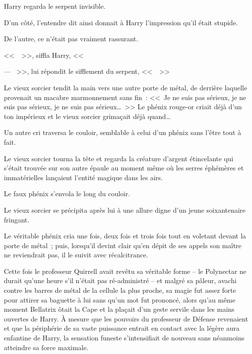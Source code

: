 Harry regarda le serpent invisible.

D'un côté, l'entendre dit ainsi donnait à Harry l'impression qu'il était stupide.

De l'autre, ce n'était pas vraiment rassurant.

<<~~>>, siffla Harry, <<~

--- ~>>, lui répondit le sifflement du serpent, <<~~>>

\later

Le vieux sorcier tendit la main vers une autre porte de métal, de derrière laquelle provenait un macabre marmonnement sans fin~: <<~Je ne suis pas sérieux, je ne suis pas sérieux, je ne suis pas sérieux…~>> Le phénix rouge-or criait déjà d'un ton impérieux et le vieux sorcier grimaçait déjà quand…

Un autre cri traversa le couloir, semblable à celui d'un phénix sans l'être tout à fait.

Le vieux sorcier tourna la tête et regarda la créature d'argent étincelante qui s'était trouvée sur son autre épaule au moment même où les serres éphémères et immatérielles lançaient l'entité magique dans les airs.

Le faux phénix s'envola le long du couloir.

Le vieux sorcier se précipita après lui à une allure digne d'un jeune soixantenaire fringant.

Le véritable phénix cria une fois, deux fois et trois fois tout en voletant devant la porte de métal~; puis, lorsqu'il devint clair qu'en dépit de ses appels son maître ne reviendrait pas, il le suivit avec récalcitrance.

\later

Cette fois le professeur Quirrell avait revêtu sa véritable forme -- le Polynectar ne durait qu'une heure s'il n'était pas ré-administré -- et malgré sa pâleur, avachi contre les barres de métal de la cellule la plus proche, sa magie fut assez forte pour attirer sa baguette à lui sans qu'un mot fut prononcé, alors qu'au même moment Bellatrix ôtait la Cape et la plaçait d'un geste servile dans les mains ouvertes de Harry. À mesure que les pouvoirs du professeur de Défense revenaient et que la périphérie de sa vaste puissance entrait en contact avec la légère aura enfantine de Harry, la sensation funeste s'intensifiait de nouveau sans néanmoins atteindre sa force maximale.

